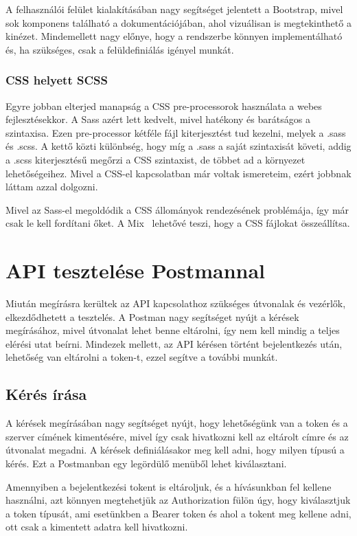 \documentclass[
]{thesis-ekf}
\theoremstyle{definition}
\theoremstyle{remark}
\begin{document}
	A felhasználói felület kialakításában nagy segítséget jelentett a Bootstrap, mivel sok komponens található a dokumentációjában, ahol vizuálisan is megtekinthető a kinézet. Mindemellett nagy előnye, hogy a rendszerbe könnyen implementálható és, ha szükséges, csak a felüldefiniálás igényel munkát.
	
	\subsection{CSS helyett SCSS}
	
	Egyre jobban elterjed manapság a CSS pre-processorok használata a webes fejlesztésekkor. A Sass azért lett kedvelt, mivel hatékony és barátságos a szintaxisa. Ezen pre-processor kétféle fájl kiterjesztést tud kezelni, melyek a .sass és .scss. A kettő közti különbség, hogy míg a .sass a saját szintaxisát követi, addig a .scss kiterjesztésű megőrzi a CSS szintaxist, de többet ad a környezet lehetőségeihez. Mivel a CSS-el kapcsolatban már voltak ismereteim, ezért jobbnak láttam azzal dolgozni. 
	
	Mivel az Sass-el megoldódik a CSS állományok rendezésének problémája, így már csak le kell fordítani őket. A Mix~\cite{laravel_mix} lehetővé teszi, hogy a CSS fájlokat összeállítsa.  
	
	\chapter{API tesztelése Postmannal}
	Miután megírásra kerültek az API kapcsolathoz szükséges útvonalak és vezérlők, elkezdődhetett a tesztelés. A Postman nagy segítséget nyújt a kérések megírásához, mivel útvonalat lehet benne eltárolni, így nem kell mindig a teljes elérési utat beírni. Mindezek mellett, az API kérésen történt bejelentkezés után, lehetőség van eltárolni a token-t, ezzel segítve a további munkát. 
	
	\section{Kérés írása}
	A kérések megírásában nagy segítséget nyújt, hogy lehetőségünk van a token és a szerver címének kimentésére, mivel így csak hivatkozni kell az eltárolt címre és az útvonalat megadni. A kérések definiálásakor meg kell adni, hogy milyen típusú a kérés. Ezt a Postmanban egy legördülő menüből lehet kiválasztani. 
	
	Amennyiben a bejelentkezési tokent is eltároljuk, és a hívásunkban fel kellene használni, azt könnyen megtehetjük az Authorization fülön úgy, hogy kiválasztjuk a token típusát, ami esetünkben a Bearer token és ahol a tokent meg kellene adni, ott csak a kimentett adatra kell hivatkozni. 
	
\end{document}
